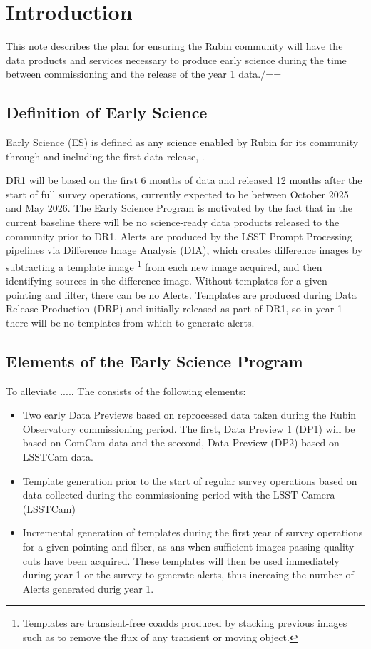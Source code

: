 \section{Introduction}

This  note describes the plan for ensuring the Rubin community will have the data products and services necessary to produce early science during the time between commissioning and the release of the year 1 data./==

\subsection{Definition of Early Science}  \label{ssec:defn}

Early Science (ES) is defined as any science enabled by Rubin for its community through and including the first data release, \drone.

DR1 will be based on the first 6 months of data and released 12 months after the start of full survey operations, currently expected to be between October 2025 and May 2026.
The Early Science Program is motivated by the fact that in the current baseline there will be no science-ready data products released to the community prior to DR1. 
Alerts are produced by the LSST Prompt Processing pipelines via Difference Image Analysis (DIA), which creates difference images by subtracting a template image \footnote{Templates are transient-free coadds produced by stacking previous images such as to remove the flux of any transient or moving object.} from each new image acquired, and then identifying sources in the difference image. 
Without templates for a given pointing and filter, there can be no Alerts.
Templates are produced during Data Release Production (DRP) and initially released as part of DR1, so in year 1 there will be no templates from which to generate alerts.


\subsection{Elements of the Early Science Program}

To  alleviate  .....  The \esp consists of the following elements:
\begin{itemize}
	\item Two early Data Previews based on reprocessed data taken during the Rubin Observatory commissioning period. The first, Data Preview 1 (DP1) will be based on ComCam data and the seccond, Data Preview (DP2) based on LSSTCam data. 
	\item Template generation prior to the start of regular survey operations based on data collected during the commissioning period with the LSST Camera (LSSTCam)
	\item Incremental generation of templates during the first year of survey operations for a given pointing and filter, as ans when sufficient images passing quality cuts have been acquired. 
	These templates will then be used immediately during year 1 or the survey to generate alerts, thus increaing the number of Alerts generated durig year 1. 
\end{itemize}


